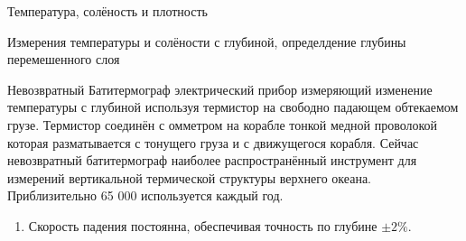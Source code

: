 \begin{chapter}{Температура, солёность и плотность}
\begin{section}{Измерения температуры и солёности с глубиной, определдение глубины перемешенного слоя}
\begin{paragraph}{Невозвратный Батитермограф}
электрический прибор измеряющий изменение температуры с глубиной
используя термистор на свободно падающем обтекаемом грузе. Термистор
соединён с омметром на корабле тонкой медной проволокой которая
разматывается с тонущего груза и с движущегося корабля. Сейчас
невозвратный батитермограф наиболее распространённый инструмент для
измерений вертикальной термической структуры верхнего
океана. Приблизительно 65 000 используется каждый год.
%



\begin{enumerate}
\item
 Скорость падения постоянна, обеспечивая точность по глубине $\pm 2\%$.


\end{enumerate}
\end{paragraph}
\end{section}
\end{chapter}
